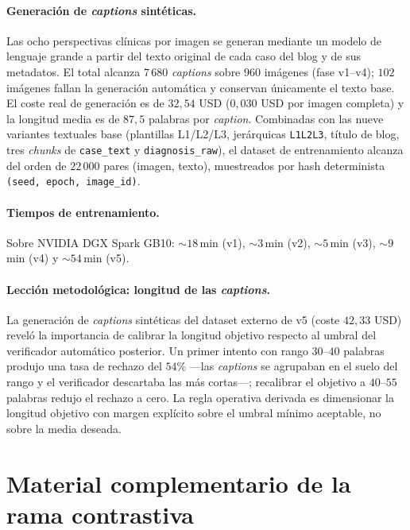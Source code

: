 \paragraph{Generación de \emph{captions} sintéticas.}
Las ocho perspectivas clínicas por imagen se generan mediante un
modelo de lenguaje grande a partir del texto original de cada caso
del blog y de sus metadatos. El total alcanza $7\,680$
\emph{captions} sobre $960$ imágenes (fase v1--v4); $102$ imágenes
fallan la generación automática y conservan únicamente el texto
base. El coste real de generación es de $32{,}54$ USD ($0{,}030$ USD
por imagen completa) y la longitud media es de $87{,}5$ palabras por
\emph{caption}. Combinadas con las nueve variantes textuales base
(plantillas L1/L2/L3, jerárquicas \texttt{L1L2L3}, título de blog,
tres \emph{chunks} de \texttt{case\_text} y \texttt{diagnosis\_raw}),
el dataset de entrenamiento alcanza del orden de $22\,000$ pares
(imagen, texto), muestreados por hash determinista
\texttt{(seed, epoch, image\_id)}.

\paragraph{Tiempos de entrenamiento.}
Sobre NVIDIA DGX Spark GB10: $\sim 18$\,min (v1), $\sim 3$\,min
(v2), $\sim 5$\,min (v3), $\sim 9$\,min (v4) y $\sim 54$\,min (v5).

\paragraph{Lección metodológica: longitud de las \emph{captions}.}
La generación de \emph{captions} sintéticas del dataset externo de
v5 (coste $42{,}33$ USD) reveló la importancia de calibrar la
longitud objetivo respecto al umbral del verificador automático
posterior. Un primer intento con rango $30$--$40$ palabras produjo
una tasa de rechazo del $54\%$ ---las \emph{captions} se agrupaban
en el suelo del rango y el verificador descartaba las más cortas---;
recalibrar el objetivo a $40$--$55$ palabras redujo el rechazo a
cero. La regla operativa derivada es dimensionar la longitud
objetivo con margen explícito sobre el umbral mínimo aceptable, no
sobre la media deseada.

\section{Material complementario de la rama contrastiva}
\label{sec:anexoi-material-contrastivo}

